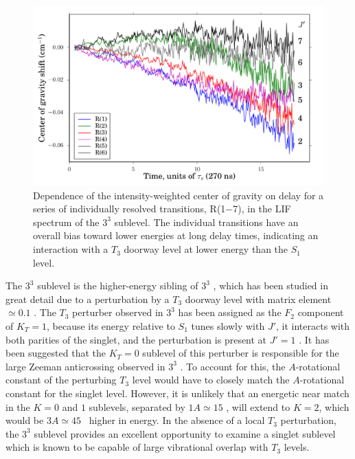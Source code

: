 \begin{figure}
  \caption{Dependence of the intensity-weighted center of gravity on
    delay for a series of individually resolved transitions, R(1$-$7),
    in the LIF spectrum of the $3^3$  sublevel.  The individual
    transitions have an overall bias toward lower energies at long
    delay times, indicating an interaction with a $T_3$ doorway level
    at lower energy than the $S_1$ level.}
  \label{fig:33k2-cog-delay}
  \centering
  \includegraphics[width=6in]{33k2-r123456-cog-delay.pdf}
\end{figure}


The $3^3$  sublevel is the higher-energy sibling of $3^3$
, which has been studied in great detail due to a
perturbation by a $T_3$ doorway level with matrix element $\simeq
0.1$ \rcm.  The $T_3$ perturber observed in $3^3$  has been
assigned as the $F_2$ component of $K_T=1$, because 
its energy relative to $S_1$ tunes slowly with $J'$,
it interacts with both parities of the singlet, and
the perturbation is present at $J'=1$
\cite{mishra04}.  It has been suggested that the $K_T=0$ sublevel of
this perturber is responsible for the large Zeeman anticrossing
observed in $3^3$  \cite{thom07, dupre93}.  To account for this,
the $A$-rotational constant of the perturbing $T_3$ level would have
to closely match the $A$-rotational constant for the singlet level.
However, it is unlikely that an energetic near match in the $K=0$ and
$1$ sublevels, separated by $1A \simeq 15$ \rcm, will extend to $K=2$,
which would be $3A \simeq 45$ \rcm\ higher in energy.  In the absence
of a local $T_3$ perturbation, the $3^3$  sublevel provides an
excellent opportunity to examine a singlet sublevel which is known to
be capable of large vibrational overlap with $T_3$ levels.

